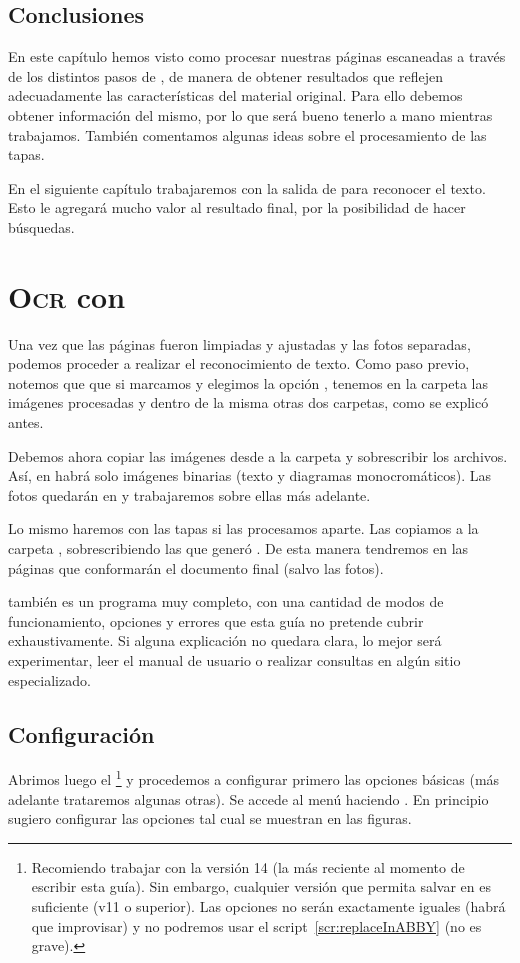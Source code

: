 \documentclass[%
	a5paper,
	10pt,
	twoside,
	openright,
	final,
]{memoir}
\begin{document}
	\section{Conclusiones} En este capítulo hemos visto como procesar nuestras páginas escaneadas a través de los distintos pasos de \scantailor, de manera de obtener resultados que reflejen adecuadamente las características del material original. Para ello debemos obtener información del mismo, por lo que será bueno tenerlo a mano mientras trabajamos. También comentamos algunas ideas sobre el procesamiento de las tapas.

	En el siguiente capítulo trabajaremos con la salida de \scantailor para reconocer el texto. Esto le agregará mucho valor al resultado final, por la posibilidad de hacer búsquedas.

	\chapter{\texorpdfstring{\textsc{Ocr}}{OCR} con \abby\label{sec:OCR}} Una vez que las páginas fueron limpiadas y ajustadas y las fotos separadas, podemos proceder a realizar el reconocimiento de texto. Como paso previo, notemos que que si marcamos  y elegimos la opción , tenemos en la carpeta  las imágenes procesadas y dentro de la misma otras dos carpetas, como se explicó antes.

	Debemos ahora copiar las imágenes desde  a la carpeta  y sobrescribir los archivos. Así, en  habrá solo imágenes binarias (texto y diagramas monocromáticos). Las fotos quedarán en  y trabajaremos sobre ellas más adelante.

	Lo mismo haremos con las tapas si las procesamos aparte. Las copiamos a la carpeta , sobrescribiendo las que generó \scantailor. De esta manera tendremos en  las páginas que conformarán el documento final (salvo las fotos).

	 \abby también es un programa muy completo, con una cantidad de modos de funcionamiento, opciones y errores que esta guía no pretende cubrir exhaustivamente. Si alguna explicación no quedara clara, lo mejor será experimentar, leer el manual de usuario o realizar consultas en algún sitio especializado.

	\section{Configuración} Abrimos luego el \abby\footnote{Recomiendo trabajar con la versión 14 (la más reciente al momento de escribir esta guía). Sin embargo, cualquier versión que permita salvar en \djvu es suficiente (v11 o superior). Las opciones no serán exactamente iguales (habrá que improvisar) y no podremos usar el script~\ref{scr:replaceInABBY} (no es grave).} y procedemos a configurar primero las opciones básicas (más adelante trataremos algunas otras). Se accede al menú haciendo . En principio sugiero configurar las opciones tal cual se muestran en las figuras.
\end{document}
